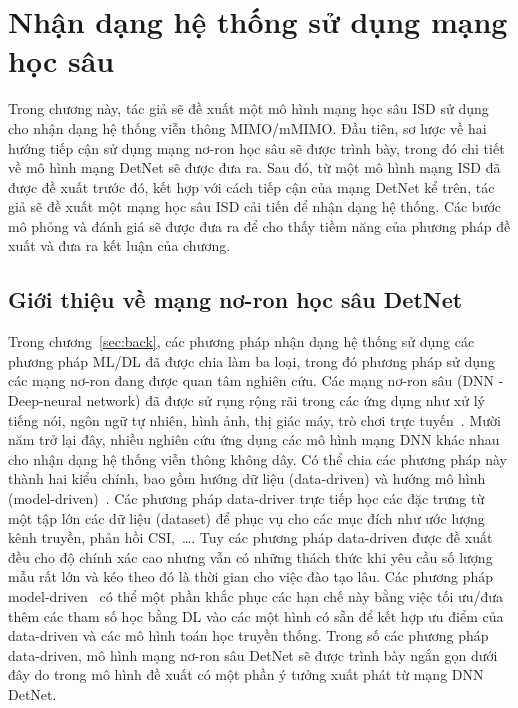 \clearpage
{}

\setcounter{chapter}{2}
\chapter[NHẬN DẠNG HỆ THỐNG SỬ DỤNG MẠNG HỌC SÂU]{Nhận dạng hệ thống sử dụng mạng học sâu}
\label{sec:ML}

Trong chương này, tác giả sẽ đề xuất một mô hình mạng học sâu ISD sử dụng cho nhận dạng hệ thống viễn thông MIMO/mMIMO. Đầu tiên, sơ lược về hai hướng tiếp cận sử dụng mạng nơ-ron học sâu sẽ được trình bày, trong đó chi tiết về mô hình mạng DetNet sẽ được đưa ra. Sau đó, từ một mô hình mạng ISD đã được đề xuất trước đó, kết hợp với cách tiếp cận của mạng DetNet kể trên, tác giả sẽ đề xuất một mạng học sâu ISD cải tiến để nhận dạng hệ thống. Các bước mô phỏng và đánh giá sẽ được đưa ra để cho thấy tiềm năng của phương pháp đề xuất và đưa ra kết luận của chương. 

\section{Giới thiệu về mạng nơ-ron học sâu DetNet}

Trong chương~\ref{sec:back}, các phương pháp nhận dạng hệ thống sử dụng các phương pháp ML/DL đã được chia làm ba loại, trong đó phương pháp sử dụng các mạng nơ-ron đang được quan tâm nghiên cứu. Các mạng nơ-ron sâu (DNN - Deep-neural network) đã được sử rụng rộng rãi trong các ứng dụng như xử lý tiếng nói, ngôn ngữ tự nhiên, hình ảnh, thị giác máy, trò chơi trực tuyến~\cite{Samek2021}. Mười năm trở lại đây, nhiều nghiên cứu ứng dụng các mô hình mạng DNN khác nhau cho nhận dạng hệ thống viễn thông không dây. Có thể chia các phương pháp này thành hai kiểu chính, bao gồm hướng dữ liệu (data-driven) và hướng mô hình (model-driven)~\cite{Liao2020}. Các phương pháp data-driver trực tiếp học các đặc trưng từ một tập lớn các dữ liệu (dataset) để phục vụ cho các mục đích như ước lượng kênh truyền, phản hồi CSI,~\ldots. Tuy các phương pháp data-driven được đề xuất đều cho độ chính xác cao nhưng vẫn có những thách thức khi yêu cầu số lượng mẫu rất lớn và kéo theo đó là thời gian cho việc đào tạo lâu. Các phương pháp model-driven~\cite{He2019} có thể một phần khắc phục các hạn chế này bằng việc tối ưu/đưa thêm các tham số học bằng DL vào các một hình có sẵn để kết hợp ưu điểm của data-driven và các mô hình toán học truyền thống. Trong số các phương pháp data-driven, mô hình mạng nơ-ron sâu DetNet sẽ được trình bày ngắn gọn dưới đây do trong mô hình đề xuất có một phần ý tưởng xuất phát từ mạng DNN DetNet.


